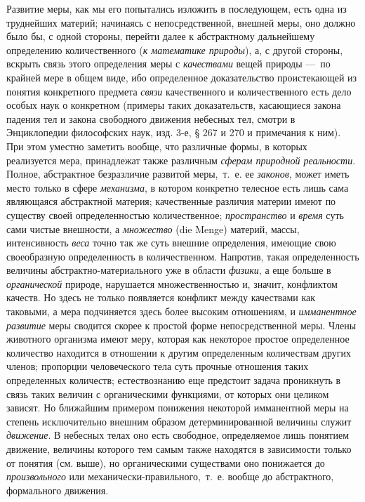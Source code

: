 Развитие меры, как мы его попытались изложить в последующем, есть одна из
труднейших материй; начинаясь с непосредственной, внешней меры, оно должно
было бы, с одной стороны, перейти далее к абстрактному дальнейшему
определению количественного ({\em к математике
природы}), а, с другой стороны, вскрыть связь этого определения меры с
{\em качествами} вещей природы —~по крайней мере в
общем виде, ибо определенное доказательство проистекающей из понятия
конкретного предмета {\em связи} качественного и
количественного есть дело особых наук о конкретном (примеры таких
доказательств, касающиеся закона падения тел и закона свободного движения
небесных тел, смотри в Энциклопедии философских наук, изд. 3-е, § 267 и 270
и примечания к ним). При этом уместно заметить вообще, что различные формы,
в которых реализуется мера, принадлежат также различным
{\em сферам природной реальности}. Полное, абстрактное
безразличие развитой меры,~т.~е. ее {\em законов},
может иметь место только в сфере {\em механизма}, в
котором конкретно телесное есть лишь сама являющаяся абстрактной материя;
качественные различия материи имеют по существу своей определенностью
количественное; {\em пространство} и
{\em время} суть сами чистые внешности, а
{\em множество} (die Menge) материй, массы,
интенсивность {\em веса} точно так же суть внешние
определения, имеющие свою своеобразную определенность в количественном.
Напротив, такая определенность величины абстрактно-материального уже в
области {\em физики}, а еще больше в
{\em органической} природе, нарушается множественностью
и, значит, конфликтом качеств. Но здесь не только появляется конфликт между
качествами как таковыми, а мера подчиняется здесь более высоким отношениям,
и {\em имманентное развитие} меры сводится скорее к
простой форме непосредственной меры. Члены животного организма имеют меру,
которая как некоторое простое определенное количество находится в отношении
к другим определенным количествам других членов; пропорции человеческого
тела суть прочные отношения таких определенных количеств; естествознанию
еще предстоит задача проникнуть в связь таких величин с органическими
функциями, от которых они целиком зависят. Но ближайшим примером понижения
некоторой имманентной меры на степень исключительно внешним образом
детерминированной величины служит {\em движение}. В
небесных телах оно есть свободное, определяемое лишь понятием движение,
величины которого тем самым также находятся в зависимости только от понятия
(см. выше), но органическими существами оно понижается до
{\em произвольного} или механически-правильного,~т.~е.
вообще до абстрактного, формального движения.

